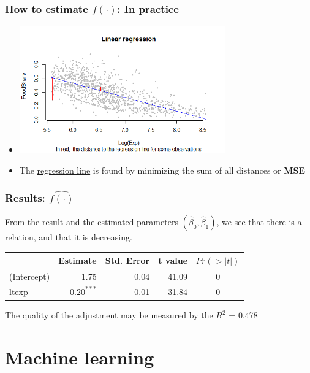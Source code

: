 \documentclass[xcolor=x11names,compress, aspectratio=169]{beamer}
\renewcommand{\(}{\begin{columns}}
\renewcommand{\)}{\end{columns}}
\newcommand{\<}[1]{\begin{column}{#1}}
\renewcommand{\>}{\end{column}}
\begin{document}
\begin{frame} %
\frametitle{How to estimate $f(\cdot)$: In practice}
 \begin{itemize}
  \item<+->[] \includegraphics[width = 0.7\textwidth]{M0-scatter-Regline-1.png}
  \item<+->[] The \href{https://mlu-explain.github.io/linear-regression/}{\textcolor[rgb]{0.00,0.50,0.75}{regression line}} is found by minimizing the sum of all distances or \textbf{MSE}
 \end{itemize}
\end{frame}


\begin{frame} %
\frametitle{Results: $ \widehat{f(\cdot)}$}
From the result and the estimated  parameters $ (\widehat \beta_0, \widehat \beta_1)$, we see that there is a relation, and that it is decreasing.
\begin{table}
\centering
\begin{tabular}{l|rrrc}
\hline
  & Estimate & Std. Error & t value & $Pr(>|t|)$\\
\hline
(Intercept) & 1.75 & 0.04 & 41.09 & 0\\
\hline
ltexp &\textbf{ $-0.20^{***}$ }& 0.01 & -31.84 & 0\\
\hline
\end{tabular}
\end{table}
\vspace{0.5cm}
 The quality of the adjustment may be measured by the $R^2$ = 0.478

\end{frame}



\section{Machine learning}
\end{document}
